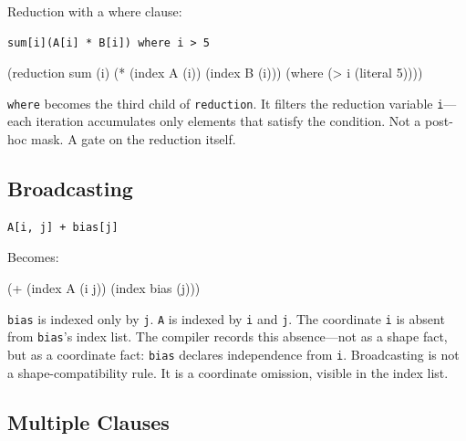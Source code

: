 \documentclass[11pt,titlepage]{article}
\newenvironment{Shaded}{}{}
\newcommand{\DecValTok}[1]{\textcolor[rgb]{0.25,0.63,0.44}{#1}}
\newcommand{\NormalTok}[1]{#1}
\newcommand{\OperatorTok}[1]{\textcolor[rgb]{0.40,0.40,0.40}{#1}}
\begin{document}
Reduction with a where clause:

\begin{verbatim}
sum[i](A[i] * B[i]) where i > 5
\end{verbatim}

\begin{Shaded}
\begin{Highlighting}[]
\NormalTok{(reduction sum (i)}
\NormalTok{  (}\OperatorTok{*}\NormalTok{ (index A (i)) (index B (i)))}
\NormalTok{  (where (}\OperatorTok{>}\NormalTok{ i (literal }\DecValTok{5}\NormalTok{))))}
\end{Highlighting}
\end{Shaded}

\texttt{where} becomes the third child of \texttt{reduction}. It filters
the reduction variable \texttt{i}---each iteration accumulates only
elements that satisfy the condition. Not a post-hoc mask. A gate on the
reduction itself.

\vspace{2em}

\hypertarget{broadcasting}{%
\subsection{Broadcasting}\label{broadcasting}}

\begin{verbatim}
A[i, j] + bias[j]
\end{verbatim}

Becomes:

\begin{Shaded}
\begin{Highlighting}[]
\NormalTok{(}\OperatorTok{+}\NormalTok{ (index A (i j)) (index bias (j)))}
\end{Highlighting}
\end{Shaded}

\texttt{bias} is indexed only by \texttt{j}. \texttt{A} is indexed by
\texttt{i} and \texttt{j}. The coordinate \texttt{i} is absent from
\texttt{bias}'s index list. The compiler records this absence---not as a
shape fact, but as a coordinate fact: \texttt{bias} declares
independence from \texttt{i}. Broadcasting is not a shape-compatibility
rule. It is a coordinate omission, visible in the index list.

\vspace{2em}

\hypertarget{multiple-clauses}{%
\subsection{Multiple Clauses}\label{multiple-clauses}}
\end{document}
